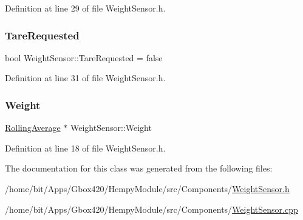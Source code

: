 Definition at line 29 of file Weight\+Sensor.\+h.

\mbox{\label{class_weight_sensor_a49737914329de6cc5cb56f4089513d23}} 
\subsubsection{\texorpdfstring{Tare\+Requested}{TareRequested}}
{\footnotesize\ttfamily bool Weight\+Sensor\+::\+Tare\+Requested = false\hspace{0.3cm}{\ttfamily [protected]}}



Definition at line 31 of file Weight\+Sensor.\+h.

\mbox{\label{class_weight_sensor_af53b96a6841dea7a0d04f7206834d09a}} 
\subsubsection{\texorpdfstring{Weight}{Weight}}
{\footnotesize\ttfamily \hyperlink{class_rolling_average}{Rolling\+Average} $\ast$ Weight\+Sensor\+::\+Weight}



Definition at line 18 of file Weight\+Sensor.\+h.



The documentation for this class was generated from the following files\+:\begin{DoxyCompactItemize}
\item 
/home/bit/\+Apps/\+Gbox420/\+Hempy\+Module/src/\+Components/\hyperlink{_hempy_module_2src_2_components_2_weight_sensor_8h}{Weight\+Sensor.\+h}\item 
/home/bit/\+Apps/\+Gbox420/\+Hempy\+Module/src/\+Components/\hyperlink{_hempy_module_2src_2_components_2_weight_sensor_8cpp}{Weight\+Sensor.\+cpp}\end{DoxyCompactItemize}
